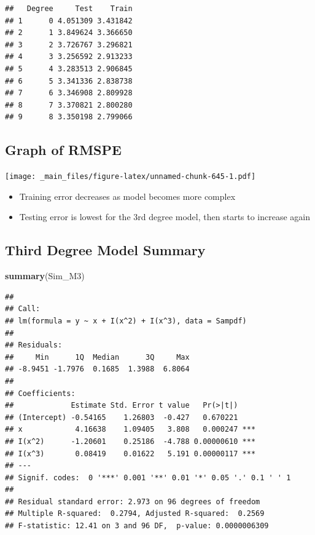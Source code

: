\documentclass[]{book}
\newenvironment{Shaded}{\begin{snugshade}}{\end{snugshade}}
\newcommand{\KeywordTok}[1]{\textcolor[rgb]{0.13,0.29,0.53}{\textbf{#1}}}
\newcommand{\NormalTok}[1]{#1}
\providecommand{\tightlist}{%
  \setlength{\itemsep}{0pt}\setlength{\parskip}{0pt}}
\begin{document}
\begin{verbatim}
##   Degree     Test    Train
## 1      0 4.051309 3.431842
## 2      1 3.849624 3.366650
## 3      2 3.726767 3.296821
## 4      3 3.256592 2.913233
## 5      4 3.283513 2.906845
## 6      5 3.341336 2.838738
## 7      6 3.346908 2.809928
## 8      7 3.370821 2.800280
## 9      8 3.350198 2.799066
\end{verbatim}

\subsection{Graph of RMSPE}\label{graph-of-rmspe}

\texttt{[image: \_main\_files/figure-latex/unnamed-chunk-645-1.pdf]}

\begin{itemize}
\tightlist
\item
  Training error decreases as model becomes more complex\\
\item
  Testing error is lowest for the 3rd degree model, then starts to
  increase again
\end{itemize}

\subsection{Third Degree Model
Summary}\label{third-degree-model-summary}

\begin{Shaded}
\begin{Highlighting}[]
\KeywordTok{summary}\NormalTok{(Sim_M3)}
\end{Highlighting}
\end{Shaded}

\begin{verbatim}
## 
## Call:
## lm(formula = y ~ x + I(x^2) + I(x^3), data = Sampdf)
## 
## Residuals:
##     Min      1Q  Median      3Q     Max 
## -8.9451 -1.7976  0.1685  1.3988  6.8064 
## 
## Coefficients:
##             Estimate Std. Error t value   Pr(>|t|)    
## (Intercept) -0.54165    1.26803  -0.427   0.670221    
## x            4.16638    1.09405   3.808   0.000247 ***
## I(x^2)      -1.20601    0.25186  -4.788 0.00000610 ***
## I(x^3)       0.08419    0.01622   5.191 0.00000117 ***
## ---
## Signif. codes:  0 '***' 0.001 '**' 0.01 '*' 0.05 '.' 0.1 ' ' 1
## 
## Residual standard error: 2.973 on 96 degrees of freedom
## Multiple R-squared:  0.2794, Adjusted R-squared:  0.2569 
## F-statistic: 12.41 on 3 and 96 DF,  p-value: 0.0000006309
\end{verbatim}
\end{document}
